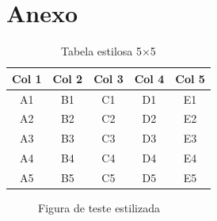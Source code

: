 \documentclass{Arquivos/TrabalhoAcademico}
\begin{document}
\inicioAnexos
\chapter{Anexo}

\begin{table}[ht]
    \centering
    \caption{Tabela estilosa 5×5}
    \label{tab:estilosa}
    \begin{tabular}{ccccc}
        \toprule
        Col 1 & Col 2 & Col 3 & Col 4 & Col 5 \\
        \midrule
        A1 & B1 & C1 & D1 & E1 \\
        A2 & B2 & C2 & D2 & E2 \\
        A3 & B3 & C3 & D3 & E3 \\
        A4 & B4 & C4 & D4 & E4 \\
        A5 & B5 & C5 & D5 & E5 \\
        \bottomrule
    \end{tabular}
\end{table}

\begin{figure}[ht]
    \centering
    \caption{Figura de teste estilizada}
    \label{fig:teste-estilosa}
\end{figure}
\end{document}

